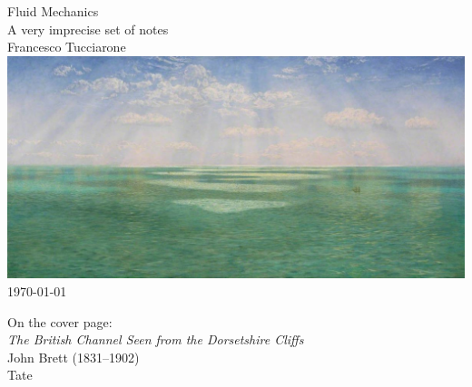 
\begin{titlepage}
    \centering
    \vfill
    \vfill
    {\Large Fluid Mechanics}\\ 
    \null
    {\normalsize A very imprecise set of notes}\\
    \null
    \medskip
    {\large Francesco Tucciarone}\\
    \vfill
    \vfill
    \includegraphics[scale=0.25]{./Front/Front_Img.jpeg}\\ %
    \vfill
    \today
\end{titlepage}
\newpage
\null
\vfill
\vfill
\vfill
\begin{minipage}[b]{0.60\textwidth}
{\flushright
On the cover page:\\
\textit{The British Channel Seen from the Dorsetshire Cliffs}\\
John Brett (1831–1902)\\
Tate\\
}
\end{minipage}
\newpage

\null
\newpage
{}      %
\tableofcontents           %

\newpage
\null
\thispagestyle{empty}      %
\newpage
{}     %
